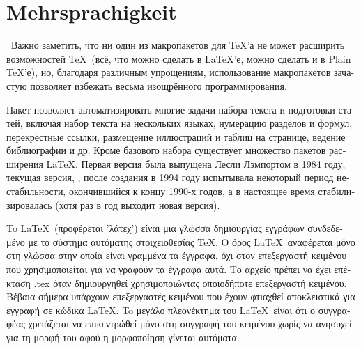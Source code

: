 \documentclass{scrartcl}
\begin{document}
	
\section{Mehrsprachigkeit}
	\begin{english}
		\blindtext
	\end{english}
	
	\blindtext 
	
	\begin{russian}\
		Важно заметить, что ни один из макропакетов для \TeX’а не может расширить возмож\-ностей \TeX\ (всё, что можно сделать в LaTeX’е, можно сделать и в Plain \TeX’е), но, благодаря различным упрощениям, использование макропакетов зачастую позволяет избежать весьма изощрённого программирования.

		Пакет позволяет автоматизировать многие задачи набора текста и подготовки статей, включая набор текста на нескольких языках, нумерацию разделов и формул, перекрёстные ссылки, размещение иллюстраций и таблиц на странице, ведение библиографии и др. Кроме базового набора существует множество пакетов расширения \LaTeX. Первая версия была выпущена Лесли Лэмпортом в 1984 году; текущая версия, \LaTeXe, после создания в 1994 году испытывала некоторый период нестабильности, окончившийся к концу 1990-х годов, а в настоящее время стабилизировалась (хотя раз в год выходит новая версия).
	\end{russian}
	
	\begin{french}
		\blindtext
	\end{french}

	\begin{greek}
		To \LaTeX\ (προφέρεται 'λάτεχ') είναι μια γλώσσα δημιουργίας εγγράφων συνδεδεμένο με το σύστημα αυτόματης στοιχειοθεσίας \TeX. Ο όρος \LaTeX\ αναφέρεται μόνο στη γλώσσα στην οποία είναι γραμμένα τα έγγραφα, όχι στον επεξεργαστή κειμένου που χρησιμοποιείται για να γραφούν τα έγγραφα αυτά. Το αρχείο πρέπει να έχει επέκταση .tex όταν δημιουργηθεί χρησιμοποιώντας οποιοδήποτε επεξεργαστή κειμένου. Βέβαια σήμερα υπάρχουν επεξεργαστές κειμένου που έχουν φτιαχθεί αποκλειστικά για εγγραφή σε κώδικα \LaTeX. To μεγάλο πλεονέκτημα του \LaTeX\ είναι ότι ο συγγραφέας χρειάζεται να επικεντρώθεί μόνο στη συγγραφή του κειμένου χωρίς να ανησυχεί για τη μορφή του αφού η μορφοποίηση γίνεται αυτόματα.
	\end{greek}
\end{document}
